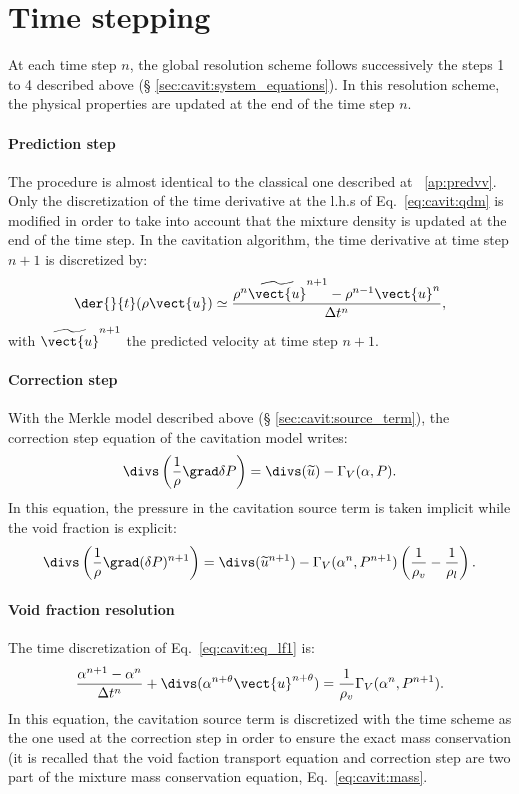 \section{Time stepping}\label{sec:cavit:time_stepping}
At each time step $n$, the global resolution scheme follows successively
the steps 1 to 4 described above (\S
\ref{sec:cavit:system_equations}). In this resolution scheme, the physical
properties are updated at the end of the time step $n$.

\paragraph{Prediction step} The procedure is almost identical to the
classical one described at \appendixname~\ref{ap:predvv}. Only the
discretization of the time derivative at the l.h.s of
Eq.~\eqref{eq:cavit:qdm} is modified in order to take into account that the
mixture density is updated at the end of the time step. In the
cavitation algorithm, the time derivative at time step $n+1$ is
discretized by:
\begin{equation*}
\der{}{
t}(\rho\vect{u})\simeq \frac{\rho^n\widetilde{\vect{u}}^{n+1}-\rho^{n-1}\vect{u}^n}{\Delta t^n},
\end{equation*}
%
with $\widetilde{\vect{u}}^{n+1}$ the predicted velocity at time step
$n+1$.
%
\paragraph{Correction step}
With the Merkle model described above (\S
\ref{sec:cavit:source_term}), the correction step equation of the
cavitation model writes:
\begin{equation*}
\divs\left(\frac{1}{\rho}\grad\delta P\right) =
\divs(\widetilde{u})-\Gamma_V(\alpha,P).
\end{equation*}
In this equation, the pressure in the cavitation source term is taken
implicit while the void fraction is explicit:
\begin{equation*}
\divs\left(\frac{1}{\rho}\grad(\delta P)^{n+1}\right) =
\divs(\widetilde{u}^{n+1})-\Gamma_V(\alpha^n,P^{n+1})\left(\frac{1}{\rho_v}-\frac{1}{\rho_l}\right).
\end{equation*}
%
\paragraph{Void fraction resolution}
The time discretization of Eq.~\eqref{eq:cavit:eq_lf1} is:
\begin{equation}\label{eq:cavit:eq_vf_dis}
\frac{\alpha^{n+1}-\alpha^n}{\Delta t^n}+\divs(\alpha^{n+\theta}\vect{u}^{n+\theta}) =
\frac{1}{\rho_v}\Gamma_V(\alpha^n,P^{n+1}).
\end{equation}
In this equation, the cavitation source term is discretized with the
time scheme as the one used at the correction step in order to
ensure the exact mass conservation (it is recalled that the void
faction transport equation and correction step are two part of the
mixture mass conservation equation, Eq.~\eqref{eq:cavit:mass}.

%
